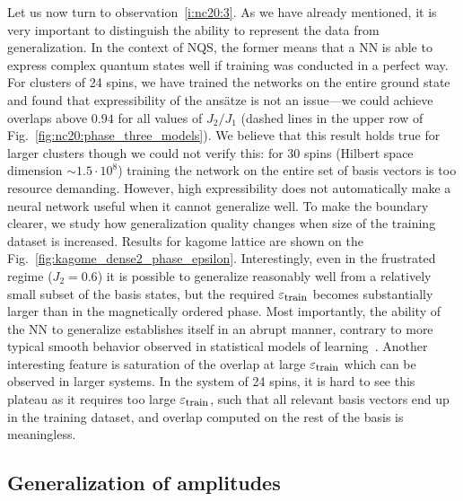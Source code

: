 Let us now turn to observation~\ref{i:nc20:3}. As we have already mentioned, it is very important to distinguish the ability to represent the data from generalization. In the context of NQS, the former means that a NN is able to express complex quantum states well if training was conducted in a perfect way. For clusters of 24 spins, we have trained the networks on the entire ground state and found that expressibility of the ans\"atze is not an issue---we could achieve overlaps above $0.94$ for all values of $J_2/J_1$ (dashed lines in the upper row of Fig.~\ref{fig:nc20:phase_three_models}). We believe that this result holds true for larger clusters though we could not verify this: for 30 spins (Hilbert space dimension $\sim 1.5\cdot 10^8$) training the network on the entire set of basis vectors is too resource demanding. However, high expressibility does not automatically make a neural network useful when it cannot generalize well. To make the boundary clearer, we study how generalization quality changes when size of the training dataset is increased. Results for kagome lattice are shown on the Fig.~\ref{fig:kagome_dense2_phase_epsilon}. Interestingly, even in the frustrated regime ($J_2=0.6$) it is possible to generalize reasonably well from a relatively small subset of the basis states, but the required $\varepsilon_{\mbox{\footnotesize train}}$ becomes substantially larger than in the magnetically ordered phase. Most importantly, the ability of the NN to generalize establishes itself in an abrupt manner, contrary to more typical smooth behavior observed in statistical models of learning~\cite{sompolinsky1990learning,seung1992statistical,baldassi2015subdominant}. Another interesting feature is saturation of the overlap at large $\varepsilon_{\mbox{\footnotesize train}}$ which can be observed in larger systems. %
In the system of 24 spins, it is hard to see this plateau as it requires too large $\varepsilon_{\mbox{\footnotesize train}}$, such that all relevant basis vectors end up in the training dataset, and overlap computed on the rest of the basis is meaningless.

\subsection{Generalization of amplitudes}

